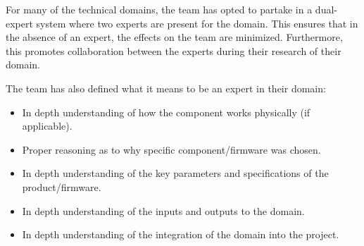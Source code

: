 \documentclass{article}
\begin{document}
For many of the technical domains, the team has opted to partake in a dual-expert system where two experts are present for the domain. This ensures that in the absence of an expert, the effects on the team are minimized. Furthermore, this promotes collaboration between the experts during their research of their domain. 

The team has also defined what it means to be an expert in their domain: 
\begin{itemize}
    \item In depth understanding of how the component works physically (if applicable). 
    \item Proper reasoning as to why specific component/firmware was chosen.
    \item In depth understanding of the key parameters and specifications of the product/firmware.
    \item In depth understanding of the inputs and outputs to the domain. 
    \item In depth understanding of the integration of the domain into the project. 
\end{itemize}
\end{document}
